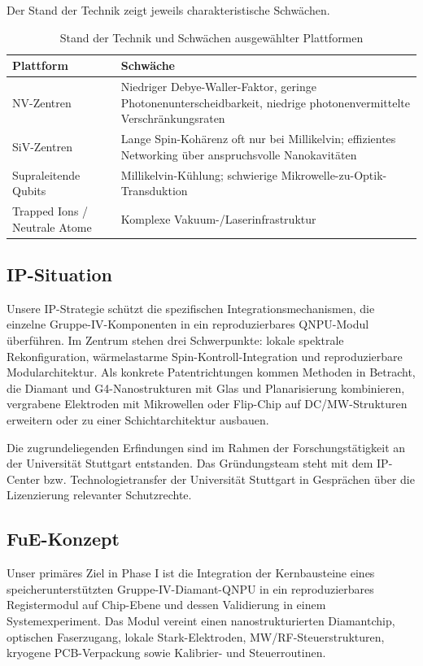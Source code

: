\documentclass[11pt,oneside]{scrartcl}
\begin{document}
Der Stand der Technik zeigt jeweils charakteristische Schw\"achen.\par
\begin{table}[ht]
\centering
\small
\begin{tabularx}{\textwidth}{>{\raggedright\arraybackslash}p{} X}
\toprule
Plattform & Schw\"ache \\
\midrule
NV-Zentren & Niedriger Debye-Waller-Faktor, geringe Photonenunterscheidbarkeit, niedrige photonenvermittelte Verschr\"ankungsraten \\
SiV-Zentren & Lange Spin-Koh\"arenz oft nur bei Millikelvin; effizientes Networking \"uber anspruchsvolle Nanokavitäten \\
Supraleitende Qubits & Millikelvin-K\"uhlung; schwierige Mikrowelle-zu-Optik-Transduktion \\
Trapped Ions / Neutrale Atome & Komplexe Vakuum-/Laserinfrastruktur \\
\bottomrule
\end{tabularx}
\caption{Stand der Technik und Schw\"achen ausgew\"ahlter Plattformen}
\end{table}

\subsection{IP-Situation}
Unsere IP-Strategie sch\"utzt die spezifischen Integrationsmechanismen, die einzelne Gruppe-IV-Komponenten in ein reproduzierbares QNPU-Modul \"uberf\"uhren. Im Zentrum stehen drei Schwerpunkte: lokale spektrale Rekonfiguration, w\"armelastarme Spin-Kontroll-Integration und reproduzierbare Modularchitektur. Als konkrete Patentrichtungen kommen Methoden in Betracht, die Diamant und G4-Nanostrukturen mit Glas und Planarisierung kombinieren, vergrabene Elektroden mit Mikrowellen oder Flip-Chip auf DC/MW-Strukturen erweitern oder zu einer Schichtarchitektur ausbauen.

Die zugrundeliegenden Erfindungen sind im Rahmen der Forschungst\"atigkeit an der Universit\"at Stuttgart entstanden. Das Gr\"undungsteam steht mit dem IP-Center bzw. Technologietransfer der Universit\"at Stuttgart in Gespr\"achen \"uber die Lizenzierung relevanter Schutzrechte.

\subsection{FuE-Konzept}
Unser prim\"ares Ziel in Phase I ist die Integration der Kernbausteine eines speicherunterst\"utzten Gruppe-IV-Diamant-QNPU in ein reproduzierbares Registermodul auf Chip-Ebene und dessen Validierung in einem Systemexperiment. Das Modul vereint einen nanostrukturierten Diamantchip, optischen Faserzugang, lokale Stark-Elektroden, MW/RF-Steuerstrukturen, kryogene PCB-Verpackung sowie Kalibrier- und Steuerroutinen.
\end{document}
